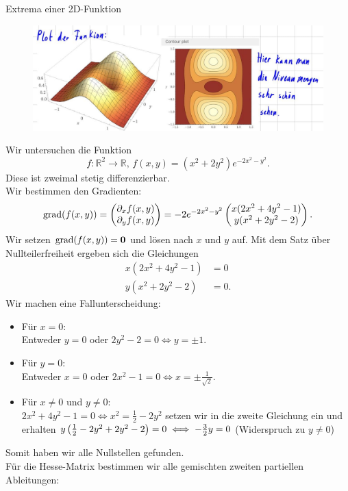 \begin{Beispiel}
{Extrema einer 2D-Funktion}
\begin{figure}
 \vspace{-15pt}
\includegraphics[width=.4\textwidth]{Dateien/08/08MinMaxFunk.jpg}
 \vspace{0pt}
\end{figure}
Wir untersuchen die Funktion
\begin{equation*}
    f:\mathbb{R}^2\to\mathbb{R},\,f(x,y)=(x^2+2y^2)e^{-2x^2-y^2}.
\end{equation*}
Diese ist zweimal stetig differenzierbar.\\
Wir bestimmen den Gradienten:
\begin{equation*}
    \text{grad}(f(x,y))=\begin{pmatrix}\partial_xf(x,y)\\\partial_yf(x,y)\end{pmatrix}=-2e^{-2x^2-y^2}\begin{pmatrix}x(2x^2+4y^2-1)\\y(x^2+2y^2-2)\end{pmatrix}.
\end{equation*}
Wir setzen $\text{grad}(f(x,y))={\text{\boldmath${0}$}}$ und lösen nach $x$ und $y$ auf. Mit dem Satz über Nullteilerfreiheit ergeben sich die Gleichungen
\begin{align*}
    x(2x^2+4y^2-1)&=0\\
    y(x^2+2y^2-2)&=0.
\end{align*}
Wir machen eine Fallunterscheidung:
\begin{itemize}
    \item Für $x=0$:\\
    Entweder $y=0$ oder $2y^2-2=0\iff y=\pm 1$.
    \item Für $y=0$:\\
    Entweder $x=0$ oder $2x^2-1=0\iff x=\pm\frac{1}{\sqrt{2}}$.
    \item Für $x\neq0$ und $y\neq 0$:\\
    $2x^2+4y^2-1=0\iff x^2=\frac{1}{2}-2y^2$ setzen wir in die zweite Gleichung ein und erhalten
    $y\left({\frac{1}{2}-2y^2+2y^2-2}\right)=0\iff-\frac{3}{2}y=0$ \Lightning (Widerspruch zu $y\neq0$)
\end{itemize}
Somit haben wir alle Nullstellen gefunden.\\
Für die Hesse-Matrix bestimmen wir alle gemischten zweiten partiellen Ableitungen:
\begin{align*}

\end{align*}
\end{Beispiel}
